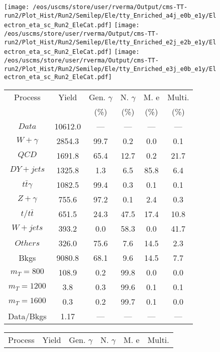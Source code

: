 \begin{figure}
\centering
\texttt{[image: /eos/uscms/store/user/rverma/Output/cms-TT-run2/Plot\_Hist/Run2/Semilep/Ele/tty\_Enriched\_a4j\_e0b\_e1y/Electron\_eta\_sc\_Run2\_EleCat.pdf]}
\texttt{[image: /eos/uscms/store/user/rverma/Output/cms-TT-run2/Plot\_Hist/Run2/Semilep/Ele/tty\_Enriched\_e2j\_e2b\_e1y/Electron\_eta\_sc\_Run2\_EleCat.pdf]}
\texttt{[image: /eos/uscms/store/user/rverma/Output/cms-TT-run2/Plot\_Hist/Run2/Semilep/Ele/tty\_Enriched\_e3j\_e0b\_e1y/Electron\_eta\_sc\_Run2\_EleCat.pdf]}
\begin{minipage}[c]{0.32\textwidth}
\centering
\tiny{
\begin{tabular}{cccccc}
\hline
Process & Yield & Gen. $\gamma$ & N. $\gamma$ & M. e & Multi. \\
 &  & (\%) & (\%) & (\%) & (\%)  \\
\hline
                                                                      $ Data $ &  10612.0 &  --- &  --- &  --- &  ---\\
$ W+\gamma $ &  2854.3 &  99.7 &  0.2 &  0.0 &  0.1\\
$ QCD $ &  1691.8 &  65.4 &  12.7 &  0.2 &  21.7\\
$ DY+jets $ &  1325.8 &  1.3 &  6.5 &  85.8 &  6.4\\
$ t\bar{t}\gamma $ &  1082.5 &  99.4 &  0.3 &  0.1 &  0.1\\
$ Z+\gamma $ &  755.6 &  97.2 &  0.1 &  2.4 &  0.3\\
$ t/t\bar{t} $ &  651.5 &  24.3 &  47.5 &  17.4 &  10.8\\
$ W+jets $ &  393.2 &  0.0 &  58.3 &  0.0 &  41.7\\
$ Others $ &  326.0 &  75.6 &  7.6 &  14.5 &  2.3\\
Bkgs &  9080.8 &  68.1 &  9.6 &  14.5 &  7.7\\
$ m_{T} = 800 $ &  108.9 &  0.2 &  99.8 &  0.0 &  0.0\\
$ m_{T} = 1200 $ &  3.8 &  0.3 &  99.6 &  0.1 &  0.1\\
$ m_{T} = 1600 $ &  0.3 &  0.2 &  99.7 &  0.1 &  0.0\\
Data/Bkgs &  1.17 &  --- &  --- &  --- &  ---\\
\hline
\end{tabular}
}
\end{minipage}
\begin{minipage}[c]{0.32\textwidth}
\centering
\tiny{
\begin{tabular}{cccccc}
\hline
Process & Yield & Gen. $\gamma$ & N. $\gamma$ & M. e & Multi. \\

\end{tabular}}
\end{minipage}
\end{figure}
